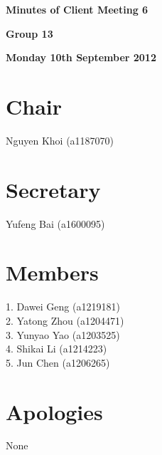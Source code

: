\documentclass[11pt, a4paper]{article}
\begin{document}
 



\vspace*{15pt}

\begin{center}
\huge \bf Minutes of Client Meeting 6
\end{center}


\begin{center}
\Large \bf Group 13
\end{center}

\begin{center}
\Large \bf Monday 10th September 2012
\end{center}

\section*{Chair}
Nguyen Khoi (a1187070)

\section*{Secretary}
Yufeng Bai (a1600095)

\section*{Members}
1. Dawei Geng (a1219181)\\
2. Yatong Zhou (a1204471)\\
3. Yunyao Yao (a1203525)\\
4. Shikai Li (a1214223)\\
5. Jun Chen (a1206265)
\vspace*{10pt}

\section*{Apologies}
None

\end{document}
